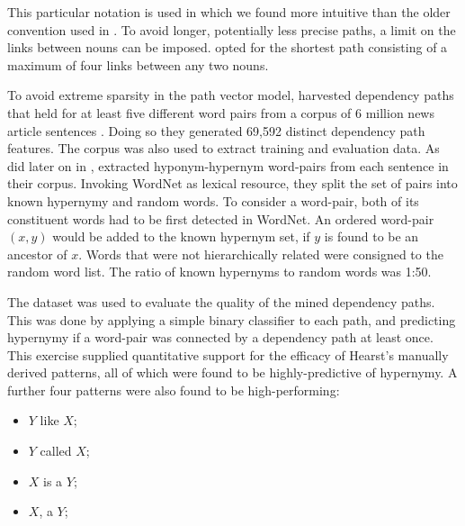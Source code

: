 This particular notation is used in \citep{shwartz2016path} which we found more intuitive than the older convention used in \citep{Snow2004}.  To avoid longer, potentially less precise paths, a limit on the links between nouns can be imposed.  \citep{Snow2004} opted for the shortest path consisting of a maximum of four links between any two nouns.

To avoid extreme sparsity in the path vector model, \citeauthor{Snow2004} harvested dependency paths that held for at least five different word pairs from a corpus of 6 million news article sentences \citep{Snow2004}.  Doing so they generated 69,592 distinct dependency path features.  The corpus was also used to extract training and evaluation data.  As \citeauthor{wu2012probase} did later on in \citep{wu2012probase}, \citeauthor{Snow2004} extracted hyponym-hypernym word-pairs from each sentence in their corpus.  Invoking WordNet \citep{Miller1995} as lexical resource, they split the set of pairs into known hypernymy and random words.  To consider a word-pair, both of its constituent words had to be first detected in WordNet.  An ordered word-pair $(x, y)$ would be added to the known hypernym set, if $y$ is found to be an ancestor of $x$.  Words that were not hierarchically related were consigned to the random word list.  The ratio of known hypernyms to random words was 1:50.    

The dataset was used to evaluate the quality of the mined dependency paths.  This was done by applying a simple binary classifier to each path, and predicting hypernymy if a word-pair was connected by a dependency path at least once.  This exercise supplied quantitative support for the efficacy of Hearst’s manually derived patterns, all of which were found to be highly-predictive of hypernymy.  A further four patterns were also found to be high-performing:
\begin{itemize}
    \item $Y$ like $X$;
    \item $Y$ called $X$;
    \item $X$ is a $Y$;
    \item $X$, a $Y$;
\end{itemize}

